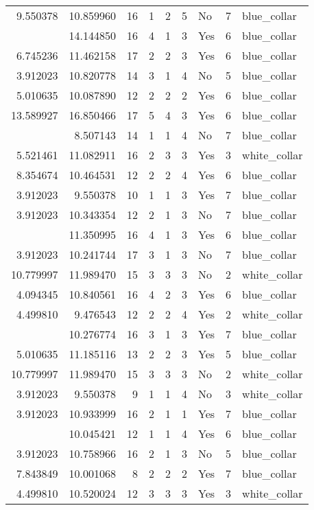 \documentclass[
]{article}
\begin{document}
\begin{longtable}[t]{rrrrrllrl}
9.550378 & 10.859960 & 16 & 1 & 2 & 5 & No & 7 & blue\_collar\\
\addlinespace
3.912023 & 14.144850 & 16 & 4 & 1 & 3 & Yes & 6 & blue\_collar\\
6.745236 & 11.462158 & 17 & 2 & 2 & 3 & Yes & 6 & blue\_collar\\
3.912023 & 10.820778 & 14 & 3 & 1 & 4 & No & 5 & blue\_collar\\
5.010635 & 10.087890 & 12 & 2 & 2 & 2 & Yes & 6 & blue\_collar\\
13.589927 & 16.850466 & 17 & 5 & 4 & 3 & Yes & 6 & blue\_collar\\
\addlinespace
3.912023 & 8.507143 & 14 & 1 & 1 & 4 & No & 7 & blue\_collar\\
5.521461 & 11.082911 & 16 & 2 & 3 & 3 & Yes & 3 & white\_collar\\
8.354674 & 10.464531 & 12 & 2 & 2 & 4 & Yes & 6 & blue\_collar\\
3.912023 & 9.550378 & 10 & 1 & 1 & 3 & Yes & 7 & blue\_collar\\
3.912023 & 10.343354 & 12 & 2 & 1 & 3 & No & 7 & blue\_collar\\
\addlinespace
3.912023 & 11.350995 & 16 & 4 & 1 & 3 & Yes & 6 & blue\_collar\\
3.912023 & 10.241744 & 17 & 3 & 1 & 3 & No & 7 & blue\_collar\\
10.779997 & 11.989470 & 15 & 3 & 3 & 3 & No & 2 & white\_collar\\
4.094345 & 10.840561 & 16 & 4 & 2 & 3 & Yes & 6 & blue\_collar\\
4.499810 & 9.476543 & 12 & 2 & 2 & 4 & Yes & 2 & white\_collar\\
\addlinespace
3.912023 & 10.276774 & 16 & 3 & 1 & 3 & Yes & 7 & blue\_collar\\
5.010635 & 11.185116 & 13 & 2 & 2 & 3 & Yes & 5 & blue\_collar\\
10.779997 & 11.989470 & 15 & 3 & 3 & 3 & No & 2 & white\_collar\\
3.912023 & 9.550378 & 9 & 1 & 1 & 4 & No & 3 & white\_collar\\
3.912023 & 10.933999 & 16 & 2 & 1 & 1 & Yes & 7 & blue\_collar\\
\addlinespace
3.912023 & 10.045421 & 12 & 1 & 1 & 4 & Yes & 6 & blue\_collar\\
3.912023 & 10.758966 & 16 & 2 & 1 & 3 & No & 5 & blue\_collar\\
7.843849 & 10.001068 & 8 & 2 & 2 & 2 & Yes & 7 & blue\_collar\\
4.499810 & 10.520024 & 12 & 3 & 3 & 3 & Yes & 3 & white\_collar\\

\end{longtable}
\end{document}
